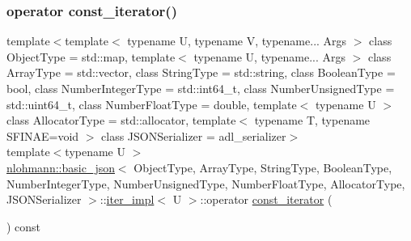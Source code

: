 \subsubsection{\texorpdfstring{operator const\+\_\+iterator()}{operator const\_iterator()}}
{\footnotesize\ttfamily template$<$template$<$ typename U, typename V, typename... Args $>$ class Object\+Type = std\+::map, template$<$ typename U, typename... Args $>$ class Array\+Type = std\+::vector, class String\+Type  = std\+::string, class Boolean\+Type  = bool, class Number\+Integer\+Type  = std\+::int64\+\_\+t, class Number\+Unsigned\+Type  = std\+::uint64\+\_\+t, class Number\+Float\+Type  = double, template$<$ typename U $>$ class Allocator\+Type = std\+::allocator, template$<$ typename T, typename S\+F\+I\+N\+A\+E=void $>$ class J\+S\+O\+N\+Serializer = adl\+\_\+serializer$>$ \\
template$<$typename U $>$ \\
\hyperlink{classnlohmann_1_1basic__json}{nlohmann\+::basic\+\_\+json}$<$ Object\+Type, Array\+Type, String\+Type, Boolean\+Type, Number\+Integer\+Type, Number\+Unsigned\+Type, Number\+Float\+Type, Allocator\+Type, J\+S\+O\+N\+Serializer $>$\+::\hyperlink{classnlohmann_1_1basic__json_1_1iter__impl}{iter\+\_\+impl}$<$ U $>$\+::operator \hyperlink{classnlohmann_1_1basic__json_a41a70cf9993951836d129bb1c2b3126a}{const\+\_\+iterator} (\begin{DoxyParamCaption}{ }\end{DoxyParamCaption}) const\hspace{0.3cm}{\ttfamily [inline]}}

\mbox{\label{classnlohmann_1_1basic__json_1_1iter__impl_af6f10c91f59565b6c6e7205ab6969a89}} 
